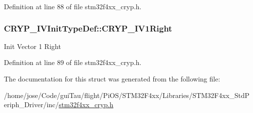 Definition at line 88 of file stm32f4xx\-\_\-cryp.\-h.

\hypertarget{struct_c_r_y_p___i_v_init_type_def_a936f532460c581298620960b511aa448}{
\subsubsection[{C\-R\-Y\-P\-\_\-\-I\-V1\-Right}]{ C\-R\-Y\-P\-\_\-\-I\-V\-Init\-Type\-Def\-::\-C\-R\-Y\-P\-\_\-\-I\-V1\-Right}}\label{struct_c_r_y_p___i_v_init_type_def_a936f532460c581298620960b511aa448}
Init Vector 1 Right 

Definition at line 89 of file stm32f4xx\-\_\-cryp.\-h.



The documentation for this struct was generated from the following file\-:\begin{DoxyCompactItemize}
\item 
/home/jose/\-Code/gui\-Tau/flight/\-Pi\-O\-S/\-S\-T\-M32\-F4xx/\-Libraries/\-S\-T\-M32\-F4xx\-\_\-\-Std\-Periph\-\_\-\-Driver/inc/\hyperlink{stm32f4xx__cryp_8h}{stm32f4xx\-\_\-cryp.\-h}\end{DoxyCompactItemize}

